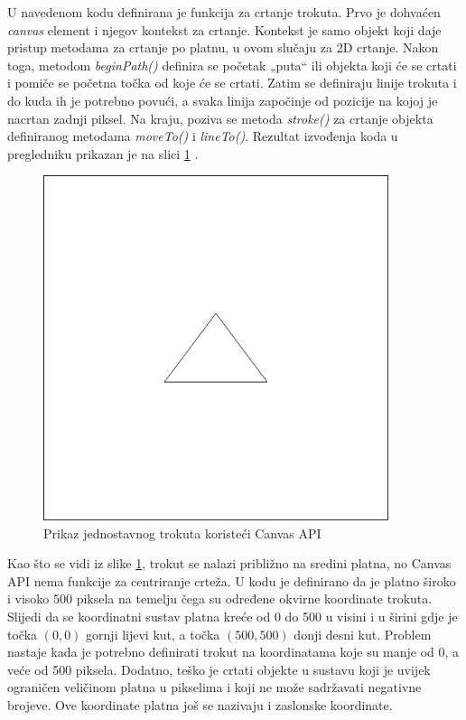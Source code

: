 \documentclass{foi}
\begin{document}
U navedenom kodu definirana je funkcija za crtanje trokuta. Prvo je dohvaćen \textit{canvas} element i njegov kontekst za crtanje. Kontekst je samo objekt koji daje pristup metodama za crtanje po platnu, u ovom slučaju za 2D crtanje. Nakon toga, metodom \textit{beginPath()} definira se početak „puta“ ili objekta koji će se crtati i pomiče se početna točka od koje će se crtati. Zatim se definiraju linije trokuta i do kuda ih je potrebno povući, a svaka linija započinje od pozicije na kojoj je nacrtan zadnji piksel. Na kraju, poziva se metoda \textit{stroke()} za crtanje objekta definiranog metodama \textit{moveTo()} i \textit{lineTo()}. Rezultat izvođenja koda u pregledniku prikazan je na slici \ref{fig:OsnovniCanvasTrokut} \parencite{MozzilaDevCanvasAPI}. 
\\
\begin{figure}[H]
    \centering
    \includegraphics[width=0.9\textwidth]{slike/1_OsnovniCanvasTrokut.png}
    \captionsetup{justification=centering}
    \caption{Prikaz jednostavnog trokuta koristeći Canvas API}
\label{fig:OsnovniCanvasTrokut}
\end{figure}

Kao što se vidi iz slike \ref{fig:OsnovniCanvasTrokut}, trokut se nalazi približno na sredini platna, no Canvas API nema funkcije za centriranje crteža. U kodu je definirano da je platno široko i visoko 500 piksela na temelju čega su određene okvirne koordinate trokuta. Slijedi da se koordinatni sustav platna kreće od 0 do 500 u visini i u širini gdje je točka $(0,0)$ gornji lijevi kut, a točka $(500,500)$ donji desni kut. Problem nastaje kada je potrebno definirati trokut na koordinatama koje su manje od 0, a veće od 500 piksela. Dodatno, teško je crtati objekte u sustavu koji je uvijek ograničen veličinom platna u pikselima i koji ne može sadržavati negativne brojeve. Ove koordinate platna još se nazivaju i zaslonske koordinate.
\end{document}
